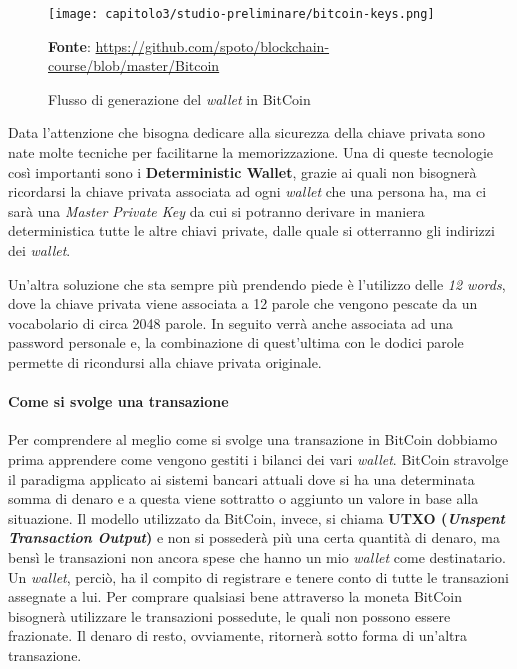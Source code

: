 \begin{figure}[tbh!]
  \centering
  \texttt{[image: capitolo3/studio-preliminare/bitcoin-keys.png]}
  \caption{Flusso di generazione del \textit{wallet} in BitCoin}
  \textbf{Fonte}: \href{https://github.com/spoto/blockchain-course/blob/master/Bitcoin}{https://github.com/spoto/blockchain-course/blob/master/Bitcoin}
\end{figure}

Data l'attenzione che bisogna dedicare alla sicurezza della chiave privata sono nate molte tecniche per facilitarne la memorizzazione. Una di queste tecnologie così importanti sono i \textbf{Deterministic Wallet}, grazie ai quali non bisognerà ricordarsi la chiave privata associata ad ogni \textit{wallet} che una persona ha, ma ci sarà una \textit{Master Private Key} da cui si potranno derivare in maniera deterministica tutte le altre chiavi private, dalle quale si otterranno gli indirizzi dei \textit{wallet}. 

Un'altra soluzione che sta sempre più prendendo piede è l'utilizzo delle \textit{12 words}, dove la chiave privata viene associata a 12 parole che vengono pescate da un vocabolario di circa 2048 parole. In seguito verrà anche associata ad una password personale e, la combinazione di quest'ultima con le dodici parole permette di ricondursi alla chiave privata originale. 

\paragraph{Come si svolge una transazione}
Per comprendere al meglio come si svolge una transazione in BitCoin dobbiamo prima apprendere come vengono gestiti i bilanci dei vari \textit{wallet}. BitCoin stravolge il paradigma applicato ai sistemi bancari attuali dove si ha una determinata somma di denaro e a questa viene sottratto o aggiunto un valore in base alla situazione. Il modello utilizzato da BitCoin, invece, si chiama \textbf{UTXO (\textit{Unspent Transaction Output})} e non si possederà più una certa quantità di denaro, ma bensì le transazioni non ancora spese che hanno un mio \textit{wallet} come destinatario. Un \textit{wallet}, perciò, ha il compito di registrare e tenere conto di tutte le transazioni assegnate a lui. Per comprare qualsiasi bene attraverso la moneta BitCoin bisognerà utilizzare le transazioni possedute, le quali non possono essere frazionate. Il denaro di resto, ovviamente, ritornerà sotto forma di un'altra transazione.

